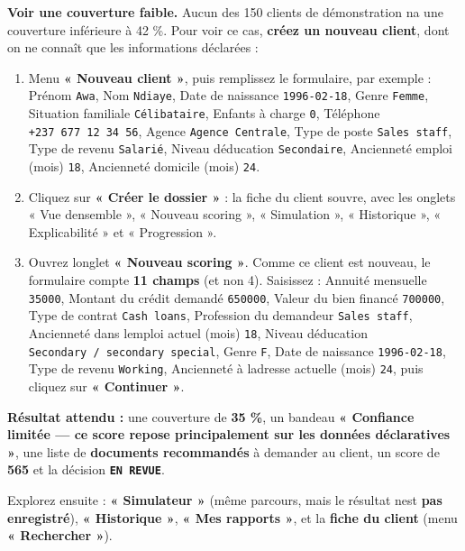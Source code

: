 \documentclass[
  french,
  11pt,
  a4paper,
]{article}
\providecommand{\tightlist}{%
  \setlength{\itemsep}{0pt}\setlength{\parskip}{0pt}}
\begin{document}
\textbf{Voir une couverture faible.} Aucun des 150 clients de
démonstration n\textquotesingle a une couverture inférieure à 42 \%.
Pour voir ce cas, \textbf{créez un nouveau client}, dont on ne connaît
que les informations déclarées :

\begin{enumerate}
\def\labelenumi{\arabic{enumi}.}
\tightlist
\item
  Menu \textbf{« Nouveau client »}, puis remplissez le formulaire, par
  exemple : Prénom \texttt{Awa}, Nom \texttt{Ndiaye}, Date de naissance
  \texttt{1996-02-18}, Genre \texttt{Femme}, Situation familiale
  \texttt{Célibataire}, Enfants à charge \texttt{0}, Téléphone
  \texttt{+237\ 677\ 12\ 34\ 56}, Agence \texttt{Agence\ Centrale}, Type
  de poste \texttt{Sales\ staff}, Type de revenu \texttt{Salarié},
  Niveau d\textquotesingle éducation \texttt{Secondaire}, Ancienneté
  emploi (mois) \texttt{18}, Ancienneté domicile (mois) \texttt{24}.
\item
  Cliquez sur \textbf{« Créer le dossier »} : la fiche du client
  s\textquotesingle ouvre, avec les onglets « Vue
  d\textquotesingle ensemble », « Nouveau scoring », « Simulation », «
  Historique », « Explicabilité » et « Progression ».
\item
  Ouvrez l\textquotesingle onglet \textbf{« Nouveau scoring »}. Comme ce
  client est nouveau, le formulaire compte \textbf{11 champs} (et non
  4). Saisissez : Annuité mensuelle \texttt{35000}, Montant du crédit
  demandé \texttt{650000}, Valeur du bien financé \texttt{700000}, Type
  de contrat \texttt{Cash\ loans}, Profession du demandeur
  \texttt{Sales\ staff}, Ancienneté dans l\textquotesingle emploi actuel
  (mois) \texttt{18}, Niveau d\textquotesingle éducation
  \texttt{Secondary\ /\allowbreak{}\ secondary\ special}, Genre
  \texttt{F}, Date de naissance \texttt{1996-02-18}, Type de revenu
  \texttt{Working}, Ancienneté à l\textquotesingle adresse actuelle
  (mois) \texttt{24}, puis cliquez sur \textbf{« Continuer »}.
\end{enumerate}

\textbf{Résultat attendu :} une couverture de \textbf{35 \%}, un bandeau
\textbf{« Confiance limitée --- ce score repose principalement sur les
données déclaratives »}, une liste de \textbf{documents recommandés} à
demander au client, un score de \textbf{565} et la décision
\textbf{\texttt{EN\ REVUE}}.

Explorez ensuite : \textbf{« Simulateur »} (même parcours, mais le
résultat n\textquotesingle est \textbf{pas enregistré}), \textbf{«
Historique »}, \textbf{« Mes rapports »}, et la \textbf{fiche du client}
(menu \textbf{« Rechercher »}).
\end{document}
